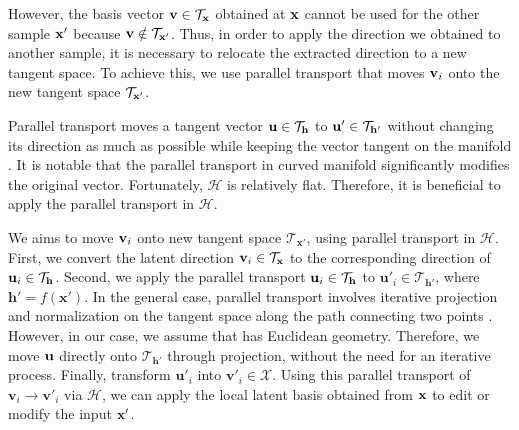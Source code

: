 However, the basis vector $\mathbf{v} \in \mathcal{T}_\mathbf{x}{}$ obtained at $\mathbf{x}$ cannot be used for the other sample $\mathbf{x}'$ because $\mathbf{v} \notin \mathcal{T}_{\mathbf{x}'}$. 
Thus, in order to apply the direction we obtained to another sample, it is necessary to relocate the extracted direction to a new tangent space.
To achieve this, we use parallel transport that moves $\mathbf{v}_i$ onto the new tangent space $\mathcal{T}_{\mathbf{x}'}$.

Parallel transport moves {a tangent vector $\mathbf{u} \in \mathcal{T}_\mathbf{h}{}$ to $\mathbf{u}' \in \mathcal{T}_{\mathbf{h}'}$} without changing its direction as much as possible while keeping the vector tangent on the manifold \cite{shao2018riemannian}.
{It is notable that the parallel transport in curved manifold significantly modifies the original vector.
Fortunately,} $\mathcal{H}$ is relatively flat. Therefore, it is beneficial to apply the parallel transport in $\mathcal{H}$.

We aims to move $\mathbf{v}_i$ onto new tangent space $\mathcal{T}_{\mathbf{x}'}$, using parallel transport in $\mathcal{H}$.
First, we convert the latent direction $\mathbf{v}_i \in \mathcal{T}_{\mathbf{x}}$ to the corresponding direction of $\mathbf{u}_i \in \mathcal{T}_{\mathbf{h}}$.
Second, we apply the parallel transport $\mathbf{u}_i \in \mathcal{T}_{\mathbf{h}}$ to ${\mathbf{u}'}_{i} \in \mathcal{T}_{\mathbf{h}'}$, where $\mathbf{h}' = f(\mathbf{x}')$. 
In the general case, parallel transport involves iterative projection and normalization on the tangent space along the path connecting two points \cite{shao2018riemannian}.
However, in our case, we assume that \ehspace{} has Euclidean geometry. 
Therefore, we move $\mathbf{u}$ directly onto $\mathcal{T}_{\mathbf{h}'}$ through projection, without the need for an iterative process.
Finally, transform $\mathbf{u}'_{i}$ into $\mathbf{v}'_i \in \mathcal{X}$.
Using this parallel transport of $\mathbf{v}_i \to \mathbf{v}'_i$ via $\mathcal{H}$, 
we can apply the local latent basis obtained from $\mathbf{x}$ to edit or modify the input $\mathbf{x}'$.


